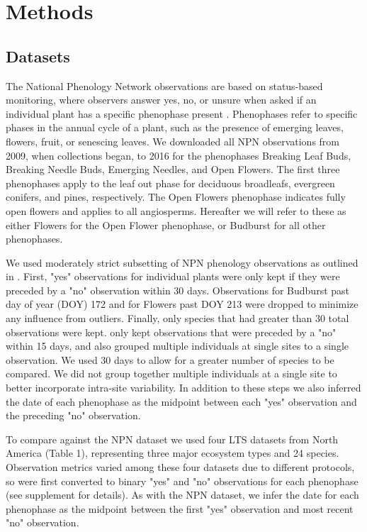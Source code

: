 \documentclass[fleqn,10pt,lineno]{wlpeerj} %
\begin{document}
\section*{Methods}

\subsection*{Datasets}

The National Phenology Network observations are based on status-based monitoring, where observers answer yes, no, or unsure when asked if an individual plant has a specific phenophase present \citep{denny2014}. Phenophases refer to specific phases in the annual cycle of a plant, such as the presence of emerging leaves, flowers, fruit, or senescing leaves. We downloaded all NPN observations from 2009, when collections began, to 2016 for the phenophases Breaking Leaf Buds, Breaking Needle Buds, Emerging Needles, and Open Flowers. The first three phenophases apply to the leaf out phase for deciduous broadleafs, evergreen conifers, and pines, respectively. The Open Flowers phenophase indicates fully open flowers and applies to all angiosperms. Hereafter we will refer to these as either Flowers for the Open Flower phenophase, or Budburst for all other phenophases. 

We used moderately strict subsetting of NPN phenology observations as outlined in \cite{crimmins2017}. First, "yes" observations for individual plants were only kept if they were preceded by a "no" observation within 30 days. Observations for Budburst past day of year (DOY) 172 and for Flowers past DOY 213 were dropped to minimize any influence from outliers. Finally, only species that had greater than 30 total observations were kept. \cite{crimmins2017} only kept observations that were preceded by a "no" within 15 days, and also grouped multiple individuals at single sites to a single observation. We used 30 days to allow for a greater number of species to be compared. We did not group together multiple individuals at a single site to better incorporate intra-site variability. In addition to these steps we also inferred the date of each phenophase as the midpoint between each "yes" observation and the preceding "no" observation. 

To compare against the NPN dataset we used four LTS datasets from North America (Table 1), representing three major ecosystem types and 24 species. Observation metrics varied among these four datasets due to different protocols, so were first converted to binary "yes" and "no" observations for each phenophase (see supplement for details). As with the NPN dataset, we infer the date for each phenophase as the midpoint between the first "yes" observation and most recent "no" observation. 
\end{document}
